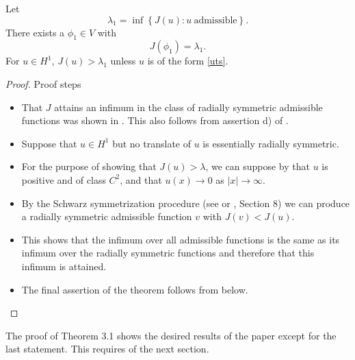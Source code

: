\begin{theorem}%
Let
    $$\lambda_1 = \inf\left\{J(u): u~\text{admissible}\right\}.$$
    There exists a $\phi_1\in V$ %
    with 
    $$J(\phi_1)=\lambda_1.$$ 
    For $u\in H^1$, $J(u)>\lambda_1$ unless $u$ is of the form \eqref{uts}.
\end{theorem}
\begin{proof}
{\red Proof steps}
\begin{itemize}
    \item That $J$ attains an infimum in the class of radially symmetric
        admissible functions was shown in \cite{nehari}. This also follows from
        assertion d) of .
    \item Suppose that $u\in H^1$ but no translate of $u$ is essentially
        radially symmetric. 
    \item For the purpose of showing that $J(u) > \lambda$, we can suppose by
         that $u$ is positive and of class $C^2$, and that
        $u(x)\to 0$ as $|x|\to \infty$.
    \item By the Schwarz symmetrization procedure (see {} or {,
        Section 8}) we can produce a radially symmetric admissible function $v$
        with $J(v)<J(u)$.
    \item This shows that the infimum over all admissible functions is the same
        as its infimum over the radially symmetric functions and therefore that
        this infimum is attained. 
    \item The final assertion of the theorem follows
        from  below.
\end{itemize}
\end{proof}

The proof of Theorem 3.1 shows the desired results of the paper except for the
last statement. This requires  of the next section.
